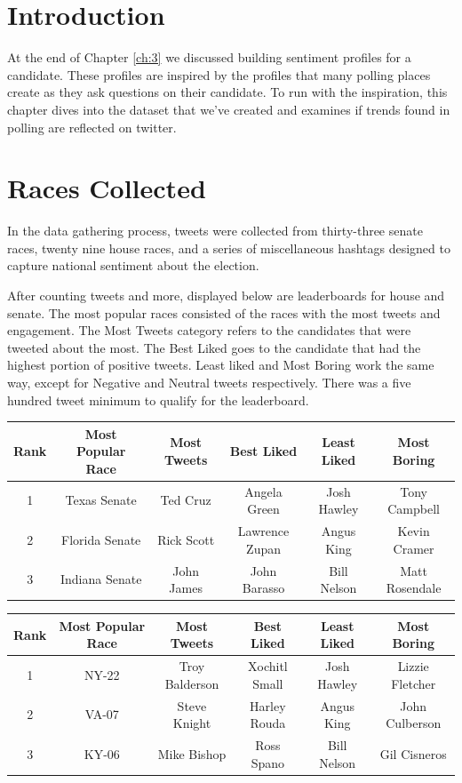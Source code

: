 \documentclass[11pt, twoside, reqno]{article}
\begin{document}
\section{Introduction}
\hspace{0.2in}At the end of Chapter \ref{ch:3} we discussed building sentiment profiles for a candidate. These profiles are inspired by the profiles that many polling places create as they ask questions on their candidate. To run with the inspiration, this chapter dives into the dataset that we've created and examines if trends found in polling are reflected on twitter.  

\section{Races Collected}
\hspace{0.2in}In the data gathering process, tweets were collected from thirty-three senate races, twenty nine house races, and a series of miscellaneous hashtags designed to capture national sentiment about the election. 

After counting tweets and more, displayed below are leaderboards for house and senate. The most popular races consisted of the races with the most tweets and engagement. The Most Tweets category refers to the candidates that were tweeted about the most. The Best Liked goes to the candidate that had the highest portion of positive tweets. Least liked and Most Boring work the same way, except for Negative and Neutral tweets respectively. There was a five hundred tweet minimum to qualify for the leaderboard. 
\begin{center}
\begin{tabular}{ |c|c|c|c|c|c|} 
	\hline
	Rank & Most Popular Race & Most Tweets & Best Liked & Least Liked & Most Boring \\
 	\hline 
	1 & Texas Senate & Ted Cruz & Angela Green & Josh Hawley & Tony Campbell\\
  	\hline
	2 & Florida Senate & Rick Scott & Lawrence Zupan & Angus King & Kevin Cramer\\ 
	\hline
	3 & Indiana Senate & John James & John Barasso & Bill Nelson& Matt Rosendale\\
	\hline
\end{tabular}
\end{center}
\begin{center}
\begin{tabular}{ |c|c|c|c|c|c|} 
	\hline
	Rank & Most Popular Race & Most Tweets & Best Liked & Least Liked & Most Boring \\
 	\hline 
	1 & NY-22 & Troy Balderson & Xochitl Small & Josh Hawley & Lizzie Fletcher\\
  	\hline
	2 & VA-07 & Steve Knight & Harley Rouda & Angus King & John Culberson\\ 
	\hline
	3 & KY-06 & Mike Bishop & Ross Spano & Bill Nelson& Gil Cisneros\\
	\hline
\end{tabular}
\end{center}
\end{document}
